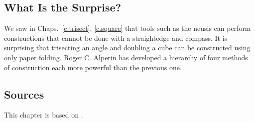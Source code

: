 \newpage

\subsection*{What Is the Surprise?}

We saw in Chaps.~\ref{c.trisect}, \ref{c.square} that tools such as the neusis can perform constructions that cannot be done with a straightedge and compass. It is surprising that trisecting an angle and doubling a cube can be constructed using only paper folding. Roger C. Alperin has developed a hierarchy of four methods of construction each more powerful than the previous one.

\subsection*{Sources}

This chapter is based on \cite{alperin,lang,martin,newton}.

